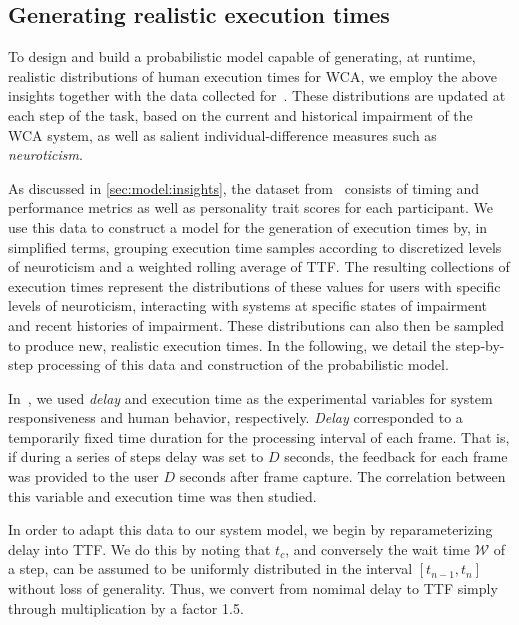 \subsection{Generating realistic execution times}\label{ssec:model:exectimes}

To design and build a probabilistic model capable of generating, at runtime, realistic distributions of human execution times for \gls{WCA}, we employ the above insights together with the data collected for~\cite{olguinmunoz2021impact}.
These distributions are updated at each step of the task, based on the current and historical impairment of the \gls{WCA} system, as well as salient individual-difference measures such as \emph{neuroticism}.

As discussed in \cref{sec:model:insights}, the dataset from~\cite{olguinmunoz2021impact} consists of timing and performance metrics as well as personality trait scores for each participant.
We use this data to construct a model for the generation of execution times by, in simplified terms, grouping execution time samples according to discretized levels of neuroticism and a weighted rolling average of \gls{TTF}.
The resulting collections of execution times represent the distributions of these values for users with specific levels of neuroticism, interacting with systems at specific states of impairment and recent histories of impairment.
These distributions can also then be sampled to produce new, realistic execution times.
In the following, we detail the step-by-step processing of this data and construction of the probabilistic model.

In~\cite{olguinmunoz2021impact}, we used \emph{delay} and execution time as the experimental variables for system responsiveness and human behavior, respectively.
\emph{Delay} corresponded to a temporarily fixed time duration for the processing interval of each frame.
That is, if during a series of steps delay was set to \( D \) seconds, the feedback for each frame was provided to the user \( D \) seconds after frame capture.
The correlation between this variable and execution time was then studied.

In order to adapt this data to our system model, we begin by reparameterizing delay into \gls{TTF}.
We do this by noting that \( t_c \), and conversely the wait time \( \mathcal{W} \) of a step, can be assumed to be uniformly distributed in the interval \( [t_{n - 1}, t_n] \) without loss of generality.
Thus, we convert from nomimal delay to \gls{TTF} simply through multiplication by a factor \num{1.5}.


